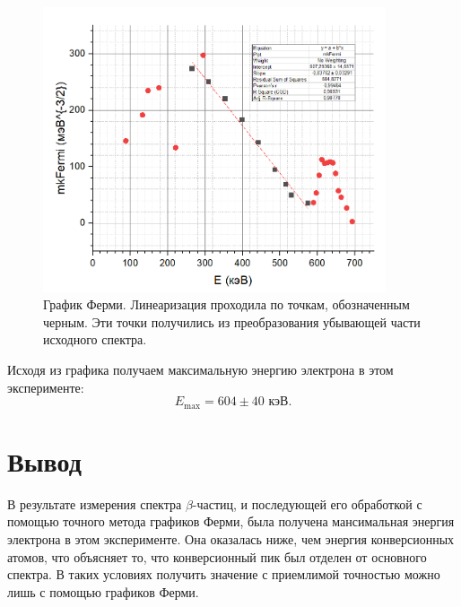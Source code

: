 \documentclass[a4paper, 14pt]{extarticle}%
\newcommand\ECaption[1]{%
     \captionsetup{font=footnotesize}%
     \caption{#1}}
\begin{document}
\begin{figure}[h]
\begin{center}
\includegraphics[width=0.9\textwidth]{gr2}
\ECaption{График Ферми. Линеаризация проходила по точкам, обозначенным черным. Эти точки получились из преобразования убывающей части исходного спектра.}
\end{center}
\end{figure}

Исходя из графика получаем максимальную энергию электрона в этом эксперименте:
\[E_{\text{max}} = 604 \pm 40 \text{ кэВ.}\]

\section*{Вывод}
В результате измерения спектра $\beta$-частиц, и последующей его обработкой с помощью точного метода графиков Ферми, была получена мансимальная энергия электрона в этом эксперименте. Она оказалась ниже, чем энергия конверсионных атомов, что объясняет то, что конверсионный пик был отделен от основного спектра. В таких условиях получить значение с приемлимой точностью можно лишь с помощью графиков Ферми. 
\end{document}

